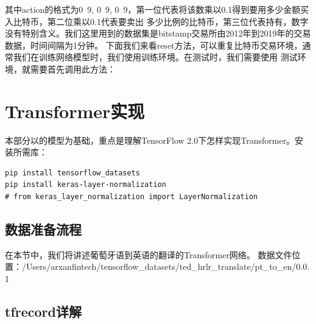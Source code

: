 \documentclass{article}
\begin{document}
其中action的格式为{0~9, 0~9, 0~9}，第一位代表将该数乘以0.1得到要用多少金额买入比特币，第二位乘以0.1代表要卖出
多少比例的比特币，第三位代表持有，数字没有特别含义。我们这里用到的数据集是bitstamp交易所由2012年到2019年的交易
数据，时间间隔为1分钟。\newline
下面我们来看reset方法，可以重复比特币交易环境，通常我们在训练网络模型时，我们使用训练环境。在测试时，我们需要使用
测试环境，就需要首先调用此方法：


\section{Transformer实现}
本部分以\cite{r000005}的模型为基础，重点是理解TensorFlow 2.0下怎样实现Transformer。安装所需库：
\lstset{language=BASH}
\begin{lstlisting}
pip install tensorflow_datasets
pip install keras-layer-normalization
# from keras_layer_normalization import LayerNormalization
\end{lstlisting}
\subsection{数据准备流程}
在本节中，我们将讲述葡萄牙语到英语的翻译的Transformer网络。
数据文件位置：/Users/arxanfintech/tensorflow\_datasets/ted\_hrlr\_translate/pt\_to\_en/0.0.1
\subsection{tfrecord详解}
\end{document}
